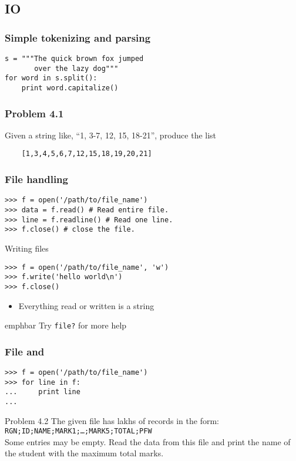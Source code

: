 \documentclass[14pt,compress]{beamer}
\newcommand{\emphbar}[1]
{\begin{beamercolorbox}[rounded=true]{emphbar} 
      {#1}
 \end{beamercolorbox}
}
\newcommand{\typ}[1]{\texttt{#1}}
\newcommand{\kwrd}[1]{ \texttt{\textbf{\color{blue}{#1}}}  }
\begin{document}

\subsection{IO}

\begin{frame}[fragile]
  \frametitle{Simple tokenizing and parsing}
  \begin{lstlisting}
s = """The quick brown fox jumped
       over the lazy dog"""
for word in s.split():
    print word.capitalize()
  \end{lstlisting}
\end{frame}

\begin{frame}[fragile]
  \frametitle{Problem 4.1}
  Given a string like, ``1, 3-7, 12, 15, 18-21'', produce the list \\
  \begin{lstlisting}
    [1,3,4,5,6,7,12,15,18,19,20,21]
  \end{lstlisting}
\end{frame}

\begin{frame}[fragile]
  \frametitle{File handling}
\begin{lstlisting}
>>> f = open('/path/to/file_name')
>>> data = f.read() # Read entire file.
>>> line = f.readline() # Read one line.
>>> f.close() # close the file.
\end{lstlisting}
Writing files
\begin{lstlisting}
>>> f = open('/path/to/file_name', 'w')
>>> f.write('hello world\n')
>>> f.close()
\end{lstlisting}
\begin{itemize}
    \item Everything read or written is a string
\end{itemize}
\emphbar{Try \typ{file?} for more help}
\end{frame}

\begin{frame}[fragile]
    \frametitle{File and \kwrd{for}}
\begin{lstlisting}
>>> f = open('/path/to/file_name')
>>> for line in f:
...     print line
...
\end{lstlisting}
\end{frame}

\begin{frame}{Problem 4.2}
    The given file has lakhs of records in the form:\\
    \typ{RGN;ID;NAME;MARK1;\ldots;MARK5;TOTAL;PFW}\\
    Some entries may be empty.  Read the data from this file and print the
    name of the student with the maximum total marks.
\end{frame}
\end{document}
